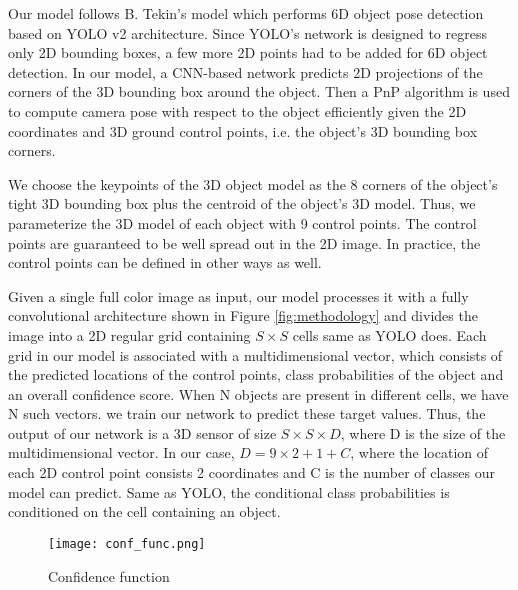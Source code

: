 Our model follows B. Tekin's model \cite{tekin2018real} which performs 6D object pose detection based on YOLO v2 architecture. Since YOLO's network is designed to regress only 2D bounding boxes, a few more 2D points had to be added for 6D object detection. In our model, a CNN-based network predicts 2D projections of the corners of the 3D bounding box around the object. Then a PnP algorithm is used to compute camera pose with respect to the object efficiently given the 2D coordinates and 3D ground control points, i.e. the object's 3D bounding box corners.

We choose the keypoints of the 3D object model as the 8 corners of the object's tight 3D bounding box plus the centroid of the object's 3D model. Thus, we parameterize the 3D model of each object with 9 control points. The control points are guaranteed to be well spread out in the 2D image. In practice, the control points can be defined in other ways as well.

Given a single full color image as input, our model processes it with a fully convolutional architecture shown in Figure \ref{fig:methodology} and divides the image into a 2D regular grid containing $ S \times S $ cells same as YOLO does. Each grid in our model is associated with a multidimensional vector, which consists of the predicted locations of the control points, class probabilities of the object and an overall confidence score. When N objects are present in different cells, we have N such vectors. we train our network to predict these target values. Thus, the output of our network is a 3D sensor of size $ S \times S \times D $, where D is the size of the multidimensional vector. In our case, $D = 9\times2+1+C$, where the location of each 2D control point consists 2 coordinates and C is the number of classes our model can predict. Same as YOLO, the conditional class probabilities is  conditioned on the cell containing an object.

\begin{figure}
\centering
  \texttt{[image: conf\_func.png]}
  \caption{Confidence function}
  \label{fig:conf_func}
\end{figure}

